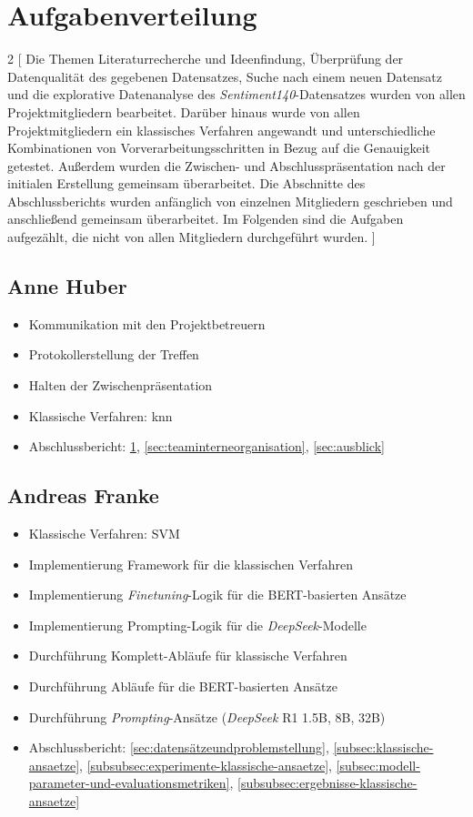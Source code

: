 \section{Aufgabenverteilung}\label{sec:aufgabenverteilung}

\begin{multicols}{2}
[
Die Themen Literaturrecherche und Ideenfindung, Überprüfung der Datenqualität des gegebenen Datensatzes, Suche nach einem neuen Datensatz und die explorative Datenanalyse des \textit{Sentiment140}-Datensatzes wurden von allen Projektmitgliedern bearbeitet.
Darüber hinaus wurde von allen Projektmitgliedern ein klassisches Verfahren angewandt und unterschiedliche Kombinationen von Vorverarbeitungsschritten in Bezug auf die Genauigkeit getestet.
Außerdem wurden die Zwischen- und Abschlusspräsentation nach der initialen Erstellung gemeinsam überarbeitet.
Die Abschnitte des Abschlussberichts wurden anfänglich von einzelnen Mitgliedern geschrieben und anschließend gemeinsam überarbeitet.
Im Folgenden sind die Aufgaben aufgezählt, die nicht von allen Mitgliedern durchgeführt wurden.
]

\subsection{Anne Huber}
\begin{itemize}
    \item Kommunikation mit den Projektbetreuern
    \item Protokollerstellung der Treffen
    \item Halten der Zwischenpräsentation
    \item Klassische Verfahren: \gls{knn}
    \item Abschlussbericht: \ref{sec:aufgabenverteilung}, \ref{sec:teaminterneorganisation}, \ref{sec:ausblick}
\end{itemize}


\subsection{Andreas Franke}
\begin{itemize}
    \item Klassische Verfahren: SVM
    \item Implementierung Framework für die klassischen Verfahren
    \item Implementierung \textit{Finetuning}-Logik für die BERT-basierten Ansätze
    \item Implementierung Prompting-Logik für die \textit{DeepSeek}-Modelle
    \item Durchführung Komplett-Abläufe für klassische Verfahren
    \item Durchführung Abläufe für die BERT-basierten Ansätze
    \item Durchführung \textit{Prompting}-Ansätze (\textit{DeepSeek} R1 1.5B, 8B, 32B)
    \item Abschlussbericht: \ref{sec:datensätzeundproblemstellung}, \ref{subsec:klassische-ansaetze}, \ref{subsubsec:experimente-klassische-ansaetze}, \ref{subsec:modell-parameter-und-evaluationsmetriken}, \ref{subsubsec:ergebnisse-klassische-ansaetze}
\end{itemize}


\end{multicols}
